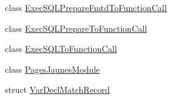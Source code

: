 \begin{DoxyCompactItemize}
\item 
class \hyperlink{classclang_1_1tidy_1_1pagesjaunes_1_1_exec_s_q_l_prepare_fmtd_to_function_call}{Exec\+S\+Q\+L\+Prepare\+Fmtd\+To\+Function\+Call}
\item 
class \hyperlink{classclang_1_1tidy_1_1pagesjaunes_1_1_exec_s_q_l_prepare_to_function_call}{Exec\+S\+Q\+L\+Prepare\+To\+Function\+Call}
\item 
class \hyperlink{classclang_1_1tidy_1_1pagesjaunes_1_1_exec_s_q_l_to_function_call}{Exec\+S\+Q\+L\+To\+Function\+Call}
\item 
class \hyperlink{classclang_1_1tidy_1_1pagesjaunes_1_1_pages_jaunes_module}{Pages\+Jaunes\+Module}
\item 
struct \hyperlink{structclang_1_1tidy_1_1pagesjaunes_1_1_var_decl_match_record}{Var\+Decl\+Match\+Record}
\end{DoxyCompactItemize}
